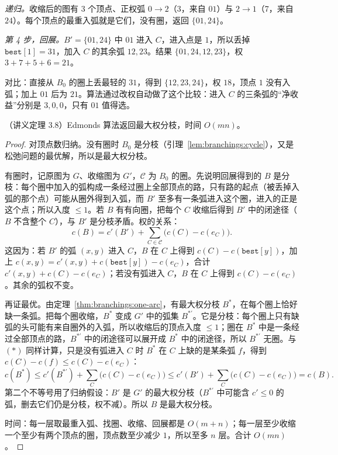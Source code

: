 \begin{example}
\emph{递归。}收缩后的图有 $3$ 个顶点、正权弧 $0\to2$（3，来自 $01$）与 $2\to1$（7，来自 $24$）。每个顶点的最重入弧就是它们，没有圈，返回 $\{01,24\}$。

\emph{第 4 步，回展。}$B'=\{01,24\}$ 中 $01$ 进入 $C$，进入点是 $1$，所以丢掉 $\texttt{best}[1]=31$，加入 $C$ 的其余弧 $12,23$。结果 $\{01,24,12,23\}$，权 $3+7+5+6=21$。

对比：直接从 $B_0$ 的圈上丢最轻的 $31$，得到 $\{12,23,24\}$，权 $18$，顶点 $1$ 没有入弧；加上 $01$ 后为 $21$。算法通过改权自动做了这个比较：进入 $C$ 的三条弧的“净收益”分别是 $3,0,0$，只有 $01$ 值得选。
\end{example}


\begin{theorem}\label{thm:branchings:correct}
（讲义定理 3.8）Edmonds 算法返回最大权分枝，时间 $O(mn)$。
\end{theorem}
\begin{proof}
对顶点数归纳。没有圈时 $B_0$ 是分枝（引理~\ref{lem:branchings:cycle}），又是松弛问题的最优解，所以是最大权分枝。

有圈时，记原图为 $G$、收缩图为 $G'$，$\mathcal C$ 为 $B_0$ 的圈。先说明回展得到的 $B$ 是分枝：每个圈中加入的弧构成一条经过圈上全部顶点的路，只有路的起点（被丢掉入弧的那个点）可能从圈外得到入弧，而 $B'$ 至多有一条弧进入这个圈，进入的正是这个点；所以入度 $\leqslant1$。若 $B$ 有有向圈，把每个 $C$ 收缩后得到 $B'$ 中的闭途径（$B$ 不含整个 $C$），与 $B'$ 是分枝矛盾。权的关系：
\[
c(B)=c'(B')+\sum_{C\in\mathcal C}\bigl(c(C)-c(e_C)\bigr).\tag{$*$}
\]
这因为：若 $B'$ 的弧 $(x,y)$ 进入 $C$，$B$ 在 $C$ 上得到 $c(C)-c(\texttt{best}[y])$，加上 $c(x,y)=c'(x,y)+c(\texttt{best}[y])-c(e_C)$，合计 $c'(x,y)+c(C)-c(e_C)$；若没有弧进入 $C$，$B$ 在 $C$ 上得到 $c(C)-c(e_C)$。其余的弧权不变。

再证最优。由定理~\ref{thm:branchings:one-arc}，有最大权分枝 $B^*$，在每个圈上恰好缺一条弧。把每个圈收缩，$B^*$ 变成 $G'$ 中的弧集 $B^{*\prime}$。它是分枝：每个圈上只有缺弧的头可能有来自圈外的入弧，所以收缩后的顶点入度 $\leqslant1$；圈在 $B^*$ 中是一条经过全部顶点的路，$B^{*\prime}$ 中的闭途径可以展开成 $B^*$ 中的闭途径，所以 $B^{*\prime}$ 无圈。与 $(*)$ 同样计算，只是没有弧进入 $C$ 时 $B^*$ 在 $C$ 上缺的是某条弧 $f$，得到 $c(C)-c(f)\leqslant c(C)-c(e_C)$：
\[
c(B^*)\leqslant c'(B^{*\prime})+\sum_{C}\bigl(c(C)-c(e_C)\bigr)\leqslant c'(B')+\sum_{C}\bigl(c(C)-c(e_C)\bigr)=c(B).
\]
第二个不等号用了归纳假设：$B'$ 是 $G'$ 的最大权分枝（$B^{*\prime}$ 中可能含 $c'\leqslant0$ 的弧，删去它们仍是分枝，权不减）。所以 $B$ 是最大权分枝。

时间：每一层取最重入弧、找圈、收缩、回展都是 $O(m+n)$；每一层至少收缩一个至少有两个顶点的圈，顶点数至少减少 $1$，所以至多 $n$ 层。合计 $O(mn)$。
\end{proof}


